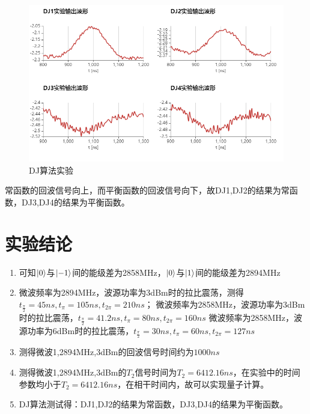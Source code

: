 \documentclass[a4paper,UTF8]{ctexart}
\begin{document}
\begin{figure}[H]
    \centering
    \begin{minipage}[b]{0.9\textwidth}
        \centering
        \includegraphics[width=1\textwidth]{./8.jpeg}
        \caption{DJ算法实验}
    \end{minipage}
\end{figure}

常函数的回波信号向上，而平衡函数的回波信号向下，故DJ1,DJ2的结果为常函数，DJ3,DJ4的结果为平衡函数。

\section{实验结论}

\begin{enumerate}
    \item 可知$\ket{0}$与$\ket{-1}$间的能级差为2858MHz，$\ket{0}$与$\ket{1}$间的能级差为2894MHz
    \item 微波频率为2894MHz，波源功率为3dBm时的拉比震荡，测得$t_{\frac{\pi}{2}} = 45ns, t_{\pi} = 105ns,t_{2\pi} = 210ns$；
    微波频率为2858MHz，波源功率为3dBm时的拉比震荡，$t_{\frac{\pi}{2}} = 41.2ns, t_{\pi} = 80ns,t_{2\pi} = 160ns$
    微波频率为2858MHz，波源功率为6dBm时的拉比震荡，$t_{\frac{\pi}{2}} = 30ns, t_{\pi} = 60ns,t_{2\pi} = 127ns$
    \item 测得微波1,2894MHz,3dBm的回波信号时间约为$1000ns$
    \item 测得微波1,2894MHz,3dBm的$T_2$信号时间为$T_2 = 6412.16ns$，在实验中的时间参数均小于$T_2 = 6412.16ns$，在相干时间内，故可以实现量子计算。
    \item DJ算法测试得：DJ1,DJ2的结果为常函数，DJ3,DJ4的结果为平衡函数。
\end{enumerate}
\end{document}
